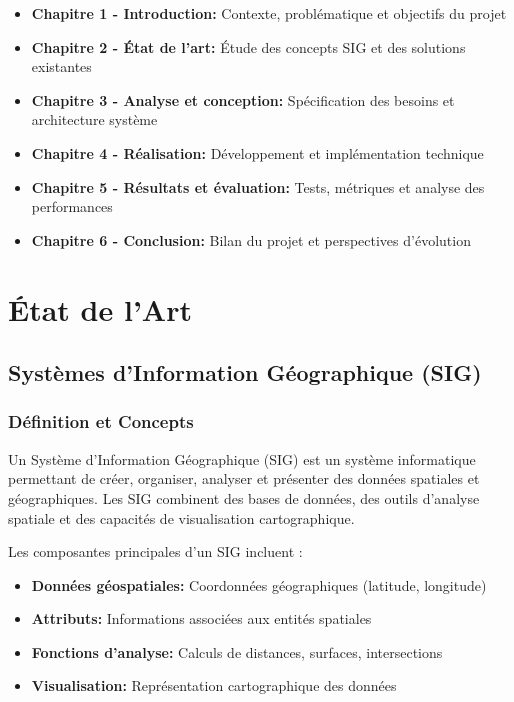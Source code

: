 \documentclass[12pt,a4paper]{report}
\begin{document}
\begin{itemize}
    \item \textbf{Chapitre 1 - Introduction:} Contexte, problématique et objectifs du projet
    \item \textbf{Chapitre 2 - État de l'art:} Étude des concepts SIG et des solutions existantes
    \item \textbf{Chapitre 3 - Analyse et conception:} Spécification des besoins et architecture système
    \item \textbf{Chapitre 4 - Réalisation:} Développement et implémentation technique
    \item \textbf{Chapitre 5 - Résultats et évaluation:} Tests, métriques et analyse des performances
    \item \textbf{Chapitre 6 - Conclusion:} Bilan du projet et perspectives d'évolution
\end{itemize}


\chapter{État de l'Art}

\section{Systèmes d'Information Géographique (SIG)}

\subsection{Définition et Concepts}

Un Système d'Information Géographique (SIG) est un système informatique permettant de créer, organiser, analyser et présenter des données spatiales et géographiques. Les SIG combinent des bases de données, des outils d'analyse spatiale et des capacités de visualisation cartographique.

Les composantes principales d'un SIG incluent :

\begin{itemize}
    \item \textbf{Données géospatiales:} Coordonnées géographiques (latitude, longitude)
    \item \textbf{Attributs:} Informations associées aux entités spatiales
    \item \textbf{Fonctions d'analyse:} Calculs de distances, surfaces, intersections
    \item \textbf{Visualisation:} Représentation cartographique des données
\end{itemize}
\end{document}
